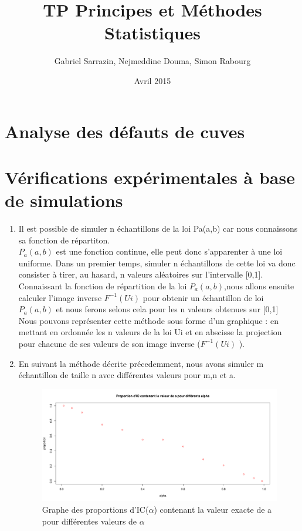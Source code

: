 \documentclass[12pt]{article}
\title{TP Principes et M\'{e}thodes Statistiques}
\author{Gabriel Sarrazin, Nejmeddine Douma, Simon Rabourg}
\date{Avril 2015}
\begin{document}

\maketitle

\section{Analyse des d\'{e}fauts de cuves}


\section{V\'{e}rifications exp\'{e}rimentales \`{a} base de simulations}


\begin{enumerate}
\item Il est possible de simuler n \'{e}chantillons de la loi Pa(a,b) car nous connaissons sa fonction de r\'{e}partiton. 
\\
$P_a(a,b)$ est une fonction continue, elle peut donc s'apparenter \`{a} une loi uniforme.  Dans un premier temps, simuler n \'{e}chantillons de cette loi va donc consister  \`{a} tirer, au hasard, n valeurs al\'{e}atoires sur l'intervalle [0,1]. Connaissant la fonction de r\'{e}partition de la loi  $P_a(a,b)$,nous allons ensuite calculer l'image inverse $ F^{-1}(Ui)$ pour obtenir un \'{e}chantillon de loi $P_a(a,b)$ et nous ferons selons cela pour les n valeurs obtenues sur [0,1]
\\
Nous pouvons repr\'{e}senter cette m\'{e}thode sous forme d'un graphique : en mettant en ordonn\'{e}e les n valeurs de la loi Ui et en abscisse la projection pour chacune de ses valeurs de son image inverse ($F^{-1}(Ui)$ ).
\\

\item
 En suivant la m\'{e}thode d\'{e}crite pr\'{e}cedemment, nous  avons simuler m \'{e}chantillon de taille n avec diff\'{e}rentes valeurs pour m,n et a. 


\begin{figure}[ht]
\label{graph1}
\centering
\includegraphics[width=1.0\textwidth]{figures/Graph_P2Q2.pdf}
\caption{Graphe des proportions d'IC($\alpha$) contenant la valeur exacte de a pour diff\'{e}rentes valeurs de $\alpha$}
\end{figure}



\end{enumerate}
\end{document}
